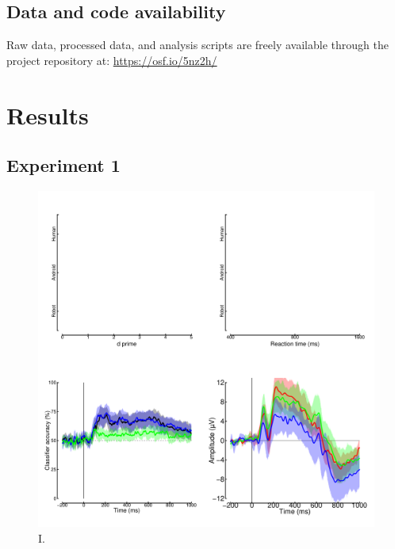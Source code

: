 \documentclass[
]{article}
\begin{document}
\hypertarget{data-and-code-availability}{%
\subsection{Data and code availability}\label{data-and-code-availability}}

Raw data, processed data, and analysis scripts are freely available through the project repository at: \url{https://osf.io/5nz2h/}

\hypertarget{results}{%
\section{Results}\label{results}}

\hypertarget{experiment-1}{%
\subsection{Experiment 1}\label{experiment-1}}

\begin{figure}

{\centering \includegraphics{Figures/RobotsData} 

}

\caption{I.}\label{fig:RobotsData}
\end{figure}
\end{document}
